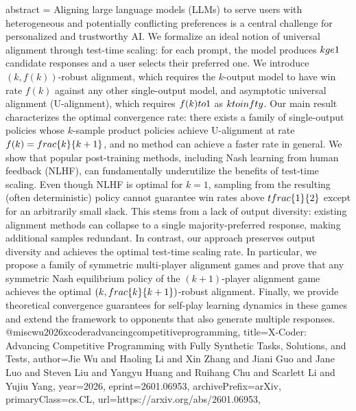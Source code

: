 {      abstract = {Aligning large language models (LLMs) to serve users with heterogeneous and potentially conflicting preferences is a central challenge for personalized and trustworthy AI. We formalize an ideal notion of universal alignment through test-time scaling: for each prompt, the model produces $k\\ge 1$ candidate responses and a user selects their preferred one. We introduce $(k,f(k))$-robust alignment, which requires the $k$-output model to have win rate $f(k)$ against any other single-output model, and asymptotic universal alignment (U-alignment), which requires $f(k)\\to 1$ as $k\\to\\infty$. Our main result characterizes the optimal convergence rate: there exists a family of single-output policies whose $k$-sample product policies achieve U-alignment at rate $f(k)=\\frac\{k\}\{k+1\}$, and no method can achieve a faster rate in general.   We show that popular post-training methods, including Nash learning from human feedback (NLHF), can fundamentally underutilize the benefits of test-time scaling. Even though NLHF is optimal for $k=1$, sampling from the resulting (often deterministic) policy cannot guarantee win rates above $\\tfrac\{1\}\{2\}$ except for an arbitrarily small slack. This stems from a lack of output diversity: existing alignment methods can collapse to a single majority-preferred response, making additional samples redundant. In contrast, our approach preserves output diversity and achieves the optimal test-time scaling rate. In particular, we propose a family of symmetric multi-player alignment games and prove that any symmetric Nash equilibrium policy of the $(k+1)$-player alignment game achieves the optimal $(k,\\frac\{k\}\{k+1\})$-robust alignment. Finally, we provide theoretical convergence guarantees for self-play learning dynamics in these games and extend the framework to opponents that also generate multiple responses.}
}@misc{wu2026xcoderadvancingcompetitiveprogramming,
      title={X-Coder: Advancing Competitive Programming with Fully Synthetic Tasks, Solutions, and Tests}, 
      author={Jie Wu and Haoling Li and Xin Zhang and Jiani Guo and Jane Luo and Steven Liu and Yangyu Huang and Ruihang Chu and Scarlett Li and Yujiu Yang},
      year={2026},
      eprint={2601.06953},
      archivePrefix={arXiv},
      primaryClass={cs.CL},
      url={https://arxiv.org/abs/2601.06953},
}
